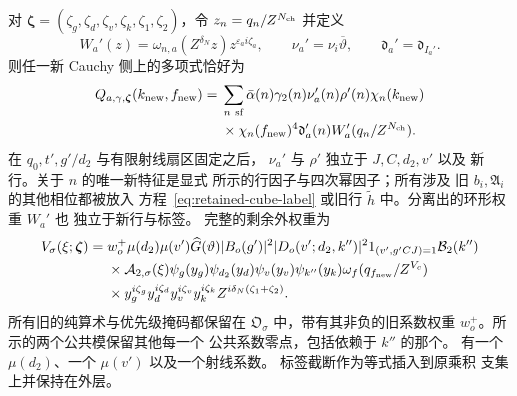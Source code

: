 对 \(\boldsymbol\zeta=(\zeta_g,\zeta_d,\zeta_v,\zeta_k,
\zeta_1,\zeta_2)\)，令 \(z_n=q_n/Z^{N_{\rm ch}}\) 并定义
\[
 W_a'(z)=\omega_{n,a}(Z^{\delta_N}z)z^{\varepsilon_a i\zeta_a},
 \qquad \nu_a'=\nu_i\overline\vartheta,\qquad
 \mathfrak d_a'=\mathfrak d_{I_a'}.
\]
则任一新 Cauchy 侧上的多项式恰好为
\begin{equation}\label{eq:canonical-child-polynomial}
 \begin{split}
 Q_{a,\gamma,\boldsymbol\zeta}(k_{\rm new},f_{\rm new})={}&
 \sum_{n\ {\rm sf}}\bar\alpha(n)\gamma_2(n)\nu_a'(n)\rho'(n)
 \chi_n(k_{\rm new})\\
 &\times\chi_n(f_{\rm new})^4
 \mathfrak d_a'(n)W_a'(q_n/Z^{N_{\rm ch}}).
 \end{split}
\end{equation}
在 \(q_0,t',g'/d_2\) 与有限射线扇区固定之后，
\(\nu_a'\) 与 \(\rho'\) 独立于 \(J,C,d_2,v'\) 以及
新行。关于 \(n\) 的唯一新特征是显式
所示的行因子与四次幂因子；所有涉及
旧 \(b_i,\mathfrak A_i\) 的其他相位都被放入
方程~\eqref{eq:retained-cube-label} 或旧行
\(\widetilde h\) 中。分离出的环形权重 \(W_a'\) 也
独立于新行与标签。
完整的剩余外权重为
\begin{equation}\label{eq:inverse-second-outer-weight}
 \begin{split}
 V_\sigma(\xi;\boldsymbol\zeta)={}&w_o^+\mu(d_2)\mu(v')\widehat G(\vartheta)
 |B_o(g')|^2|D_o(v';d_2,k'')|^2
 1_{(v',g'CJ)=1}\mathcal B_2(k'')\\
 &\times\mathcal A_{2,\sigma}(\xi)
 \psi_g(y_g)\psi_{d_2}(y_d)\psi_v(y_v)\psi_{k''}(y_k)
 \omega_f(q_{f_{\rm new}}/Z^{V_c})\\
 &\times y_g^{i\zeta_g}y_d^{i\zeta_d}y_v^{i\zeta_v}y_k^{i\zeta_k}
       Z^{i\delta_N(\zeta_1+\zeta_2)}.
 \end{split}
\end{equation}
所有旧的纯算术与优先级掩码都保留在
\(\mathfrak O_\sigma\) 中，带有其非负的旧系数权重
\(w_o^+\)。所示的两个公共模保留其他每一个
公共系数零点，包括依赖于 \(k''\) 的那个。
有一个 \(\mu(d_2)\)、一个 \(\mu(v')\) 以及一个射线系数。
标签截断作为等式插入到原乘积
支集上并保持在外层。
